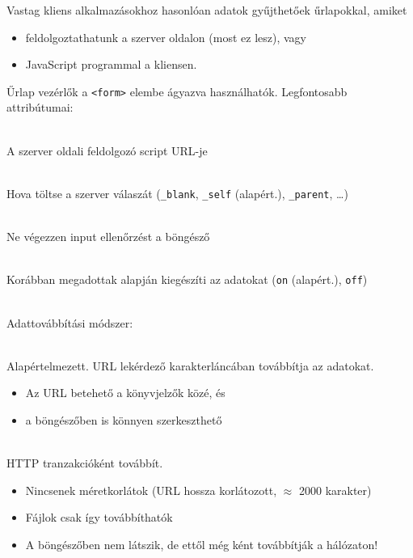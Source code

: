 \begin{frame}
  Vastag kliens alkalmazásokhoz hasonlóan adatok gyűjthetőek űrlapokkal, amiket 
  \begin{itemize}
    \item feldolgoztathatunk a szerver oldalon (most ez lesz), vagy
    \item JavaScript programmal a kliensen.
  \end{itemize}
  Űrlap vezérlők a \texttt{<form>} elembe ágyazva használhatók. Legfontosabb attribútumai:
  \begin{description}[m]
    \item[\texttt{action}] \hfill \\ A szerver oldali feldolgozó script URL-je
    \item[\texttt{target}] \hfill \\ Hova töltse a szerver válaszát 
    (\texttt{\_blank}, \texttt{\_self} (alapért.), \texttt{\_parent}, \dots)
    \item[\texttt{novalidate}] \hfill \\ Ne végezzen input 
    ellenőrzést a böngésző
    \item[\texttt{autocomplete}] \hfill \\ Korábban megadottak alapján 
    kiegészíti az adatokat (\texttt{on} (alapért.), \texttt{off})
  \end{description}
\end{frame}

\begin{frame}
  \begin{description}[m]
    \item[\texttt{method}] \hfill \\ Adattovábbítási módszer:
    \begin{description}[m]
      \item[\texttt{get}] \hfill \\ Alapértelmezett. URL lekérdező 
      karakterláncában továbbítja az adatokat.
      \begin{itemize}
        \item Az URL betehető a könyvjelzők közé, és
        \item a böngészőben is könnyen szerkeszthető
      \end{itemize}
      \item[\texttt{post}] \hfill \\ HTTP tranzakcióként továbbít.
      \begin{itemize}
        \item Nincsenek méretkorlátok (URL hossza korlátozott, 
        $\approx$ 2000 karakter)
        \item Fájlok csak így továbbíthatók
        \item A böngészőben nem látszik, de ettől még ként továbbítják a hálózaton!
      \end{itemize}
    \end{description}
  \end{description}
\end{frame}

